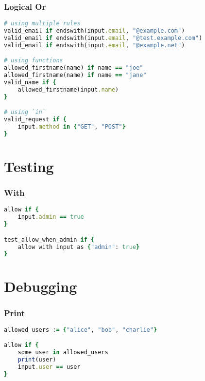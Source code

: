 \documentclass[twocolumn]{article}
\begin{document}
\vspace{-1em}
\subsubsection*{Logical Or}

\begin{lstlisting}[language=Ruby]
# using multiple rules
valid_email if endswith(input.email, "@example.com")
valid_email if endswith(input.email, "@test.example.com")
valid_email if endswith(input.email, "@example.net")

# using functions
allowed_firstname(name) if name == "joe"
allowed_firstname(name) if name == "jane"
valid_name if {
	allowed_firstname(input.name)
}

# using `in`
valid_request if {
	input.method in {"GET", "POST"}
}
\end{lstlisting}






\section*{Testing}




\vspace{-1em}
\subsubsection*{With}

\begin{lstlisting}[language=Ruby]
allow if {
	input.admin == true
}

test_allow_when_admin if {
	allow with input as {"admin": true}
}
\end{lstlisting}






\section*{Debugging}




\vspace{-1em}
\subsubsection*{Print}

\begin{lstlisting}[language=Ruby]
allowed_users := {"alice", "bob", "charlie"}

allow if {
	some user in allowed_users
	print(user)
	input.user == user
}
\end{lstlisting}
\end{document}
